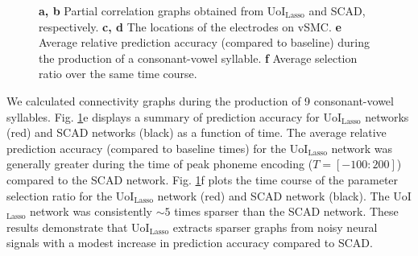\documentclass[letterpaper, 10 pt, conference]{ieeeconf}  %
\begin{document}
\begin{figure}[t!]
    \centering
    \caption{\textbf{a, b} Partial correlation graphs obtained from UoI$_{\text{Lasso}}$ and SCAD, respectively. \textbf{c, d} The locations of the electrodes on vSMC. \textbf{e} Average relative prediction accuracy (compared to baseline) during the production of a consonant-vowel syllable. \textbf{f} Average selection ratio over the same time course.}
    \label{fig:vsmc}
\end{figure}

We calculated connectivity graphs during the production of 9 consonant-vowel syllables. Fig. \ref{fig:vsmc}e displays a summary of prediction accuracy for UoI$_{\text{Lasso}}$ networks (red) and SCAD networks (black) as a function of time. The average relative prediction accuracy (compared to baseline times) for the UoI$_{\text{Lasso}}$ network was generally greater during the time of peak phoneme encoding ($T = \left[-100:200\right]$) compared to the SCAD network. Fig. \ref{fig:vsmc}f plots the time course of the parameter selection ratio for the UoI$_{\text{Lasso}}$ network (red) and SCAD network (black). The UoI$_{\text{Lasso}}$ network was consistently $\sim5$ times sparser than the SCAD network. These results demonstrate that UoI$_{\text{Lasso}}$ extracts sparser graphs from noisy neural signals with a modest increase in prediction accuracy compared to SCAD.
\end{document}
